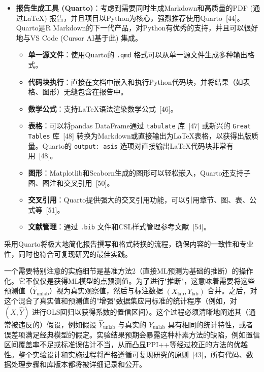 \documentclass[12pt,a4paper]{article}
\begin{document}
\begin{itemize}
    \item \textbf{报告生成工具 (Quarto)}：考虑到需要同时生成Markdown和高质量的PDF (通过LaTeX) 报告，并且项目以Python为核心，强烈推荐使用Quarto~{[44]}。Quarto是R Markdown的下一代产品，对Python有优秀的支持，并且可以很好地与VS Code (Cursor AI基于此) 集成。
    \begin{itemize}
        \item \textbf{单一源文件}：使用Quarto的 \texttt{.qmd} 格式可以从单一源文件生成多种输出格式。
        \item \textbf{代码块执行}：直接在文档中嵌入和执行Python代码块，并将结果（如表格、图形）无缝包含在报告中。
        \item \textbf{数学公式}：支持LaTeX语法渲染数学公式~{[46]}。
        \item \textbf{表格}：可以将pandas DataFrame通过 \texttt{tabulate} 库~{[47]} 或新兴的 \texttt{Great Tables} 库~{[48]} 转换为Markdown或直接输出为LaTeX表格，以获得出版质量。Quarto的 \texttt{output: asis} 选项对直接输出LaTeX代码块非常有用~{[48]}。
        \item \textbf{图形}：Matplotlib和Seaborn生成的图形可以轻松嵌入，Quarto还支持子图、图注和交叉引用~{[50]}。
        \item \textbf{交叉引用}：Quarto提供强大的交叉引用功能，可以引用章节、图、表、公式等~{[51]}。
        \item \textbf{文献管理}：通过 \texttt{.bib} 文件和CSL样式管理参考文献~{[54]}。
    \end{itemize}
\end{itemize}
采用Quarto将极大地简化报告撰写和格式转换的流程，确保内容的一致性和专业性，同时也符合可复现研究的最佳实践。

一个需要特别注意的实施细节是基准方法2（直接ML预测为基础的推断）的操作化。它不仅仅是获得ML模型的点预测值。为了进行"推断"，这意味着需要将这些预测值（$\hat{Y}_{\text{unlab}}$）视为真实观察值，然后与标注数据 $(X_{\text{lab}},Y_{\text{lab}})$ 合并。之后，对这个混合了真实值和预测值的"增强"数据集应用标准的统计程序（例如，对 $(X,\hat{Y})$ 进行OLS回归以获得系数的置信区间）。这个过程必须清晰地阐述其（通常被违反的）假设，例如假设 $\hat{Y}_{\text{unlab}}$ 与真实的 $Y_{\text{unlab}}$ 具有相同的统计特性，或者误差项满足经典模型的假定。实验结果预期会暴露这种朴素方法的缺陷，例如置信区间覆盖率不足或标准误估计不当，从而凸显PPI++等经过校正的方法的优越性。整个实验设计和实施过程将严格遵循可复现研究的原则~{[43]}，所有代码、数据处理步骤和库版本都将被详细记录和公开。
\end{document}
